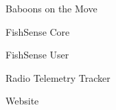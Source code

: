 \item Baboons on the Move
\item FishSense Core
\item FishSense User
\item Radio Telemetry Tracker
\item Website

